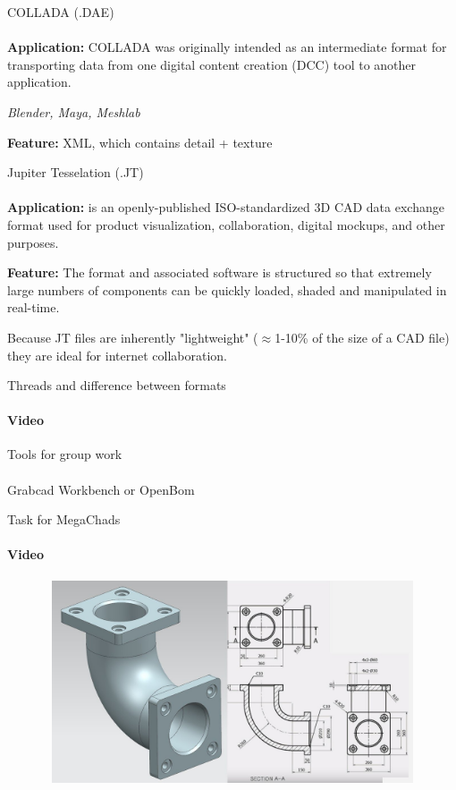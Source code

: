 \documentclass[aspectratio=169]{beamer}
\begin{document}
\begin{frame}[t]{COLLADA (.DAE)}
\framesubtitle{}
\textbf{Application:} COLLADA was originally intended as an intermediate format for transporting data from one digital content creation (DCC) tool to another application.

\textit{Blender, Maya, Meshlab}

\textbf{Feature:} XML, which contains detail + texture

\end{frame}

\begin{frame}[t]{Jupiter Tesselation (.JT)}
\framesubtitle{}
\textbf{Application:} is an openly-published ISO-standardized 3D CAD data exchange format used for product visualization, collaboration, digital mockups, and other purposes.

\textbf{Feature:} The format and associated software is structured so that extremely large numbers of components can be quickly loaded, shaded and manipulated in real-time. 

Because JT files are inherently "lightweight" ($\approx $1-10\% of the size of a CAD file) they are ideal for internet collaboration.

\end{frame}

\begin{frame}[t]{Threads and difference between formats}
\framesubtitle{Video}
    
\end{frame}

\begin{frame}[c]{Tools for group work}
\framesubtitle{}
\LARGE
\centering Grabcad Workbench or OpenBom
    
\end{frame}

\begin{frame}[t]{Task for MegaChads}
    \framesubtitle{Video}
    \vspace{-0.6cm}
    \begin{figure}[H]
        \href{https://youtu.be/LirvZRS8lRQ}{
            \centering\includegraphics[height=6cm,width=1\textwidth,keepaspectratio]{megachad.jpg}}
        \label{fig:megachad.jpg}
    \end{figure}
\end{frame}
\end{document}
